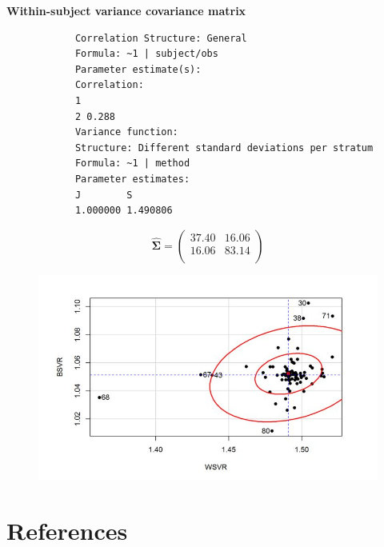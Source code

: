 \documentclass[compress]{beamer}        %
\makeatletter
\newcommand{\tcb}{\textcolor{beamer@blendedblue}}
\makeatother
\begin{document}
		\begin{frame}[fragile]{\bf \tcb{Within-subject variance covariance matrix}}
			\begin{verbatim}
			Correlation Structure: General
			Formula: ~1 | subject/obs
			Parameter estimate(s):
			Correlation:
			1
			2 0.288
			Variance function:
			Structure: Different standard deviations per stratum
			Formula: ~1 | method
			Parameter estimates:
			J        S
			1.000000 1.490806
			\end{verbatim}
			\[
			\hat{\boldsymbol{\Sigma}} = \left(
			\begin{array}{cc}
			37.40 & 16.06 \\
			16.06 & 83.14 \\
			\end{array}\right)
			\]
		\end{frame}
\begin{frame}
	\begin{figure}
\centering
\includegraphics[width=0.99\linewidth]{images/CaseDeletionDiagnosticsVR}
\end{figure}

\end{frame}
		\section[References]{References}
\end{document}
